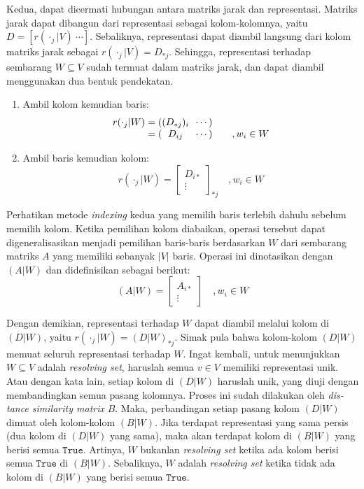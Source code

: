 \documentclass[10pt,twocolumn]{article}
\newcommand{\foreign}[1]{\foreignlanguage{english}{\textit{#1}}}
\def\True{\mathtt{True}}
\begin{document}
Kedua, dapat dicermati hubungan antara matriks jarak dan representasi. Matriks jarak dapat dibangun dari representasi sebagai kolom-kolomnya, yaitu \(D = [r(\cdot_j|V)\ \cdots]\). Sebaliknya, representasi dapat diambil langsung dari kolom matriks jarak sebagai \(r(\cdot_j|V) = D_{*j}\). Sehingga, representasi terhadap sembarang \(W \subseteq V\) sudah termuat dalam matriks jarak, dan dapat diambil menggunakan dua bentuk pendekatan.
\begin{enumerate}
	\item Ambil kolom kemudian baris:
		\[
		\begin{array}{r@{}c@{\ }l}
			r(\cdot_j|W) = (&(D_{*j})_i&\ \cdots) \\
			= (&D_{ij}&\ \cdots) \qquad, w_i \in W
		\end{array}
		\]
	\item Ambil baris kemudian kolom:
		\[
			r(\cdot_j|W) = \left[ \begin{array}{c} D_{i*}\\ \vdots \end{array} \right]_{\displaystyle *j} \quad, w_i \in W
		\]
\end{enumerate}

Perhatikan metode \foreign{indexing} kedua yang memilih baris terlebih dahulu sebelum memilih kolom. Ketika pemilihan kolom diabaikan, operasi tersebut dapat digeneralisasikan menjadi pemilihan baris-baris berdasarkan \(W\) dari sembarang matriks \(A\) yang memiliki sebanyak \(|V|\) baris. Operasi ini dinotasikan dengan \((A|W)\) dan didefinisikan sebagai berikut:
	\[ (A|W) = \left[ \begin{array}{c} A_{i*}\\ \vdots \end{array} \right] \quad, w_i \in W \]

Dengan demikian, representasi terhadap \(W\) dapat diambil melalui kolom di \((D|W)\), yaitu \(r(\cdot_j|W) = (D|W)_{*j}\). Simak pula bahwa kolom-kolom \((D|W)\) memuat seluruh representasi terhadap \(W\). Ingat kembali, untuk menunjukkan \(W \subseteq V\) adalah \foreign{resolving set}, haruslah semua \(v \in V\) memiliki representasi unik. Atau dengan kata lain, setiap kolom di \((D|W)\) haruslah unik, yang diuji dengan membandingkan semua pasang kolomnya. Proses ini sudah dilakukan oleh \foreign{distance similarity matrix} \(B\). Maka, perbandingan setiap pasang kolom \((D|W)\) dimuat oleh kolom-kolom \((B|W)\). Jika terdapat representasi yang sama persis (dua kolom di \((D|W)\) yang sama), maka akan terdapat kolom di \((B|W)\) yang berisi semua \(\True\). Artinya, \(W\) bukanlan \foreign{resolving set} ketika ada kolom berisi semua \(\True\) di \((B|W)\). Sebaliknya, \(W\) adalah \foreign{resolving set} ketika tidak ada kolom di \((B|W)\) yang berisi semua \(\True\).
\end{document}
